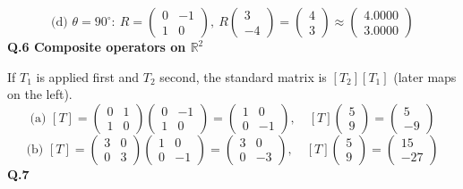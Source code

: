 \[ \text{(d) }\theta=90^\circ:\ R=\begin{pmatrix}0 & -1 \\ 1 & 0\end{pmatrix},\ R\begin{pmatrix}3\\-4\end{pmatrix}=\begin{pmatrix}4 \\ 3\end{pmatrix}\approx\begin{pmatrix}4.0000\\3.0000\end{pmatrix} \]
\medskip\noindent\textbf{Q.6  Composite operators on $\mathbb{R}^2$}\par\smallskip
If $T_1$ is applied first and $T_2$ second, the standard matrix is $[T_2][T_1]$ (later maps on the left).
\[ \text{(a) }[T]=\begin{pmatrix}0 & 1 \\ 1 & 0\end{pmatrix}\begin{pmatrix}0 & -1 \\ 1 & 0\end{pmatrix}=\begin{pmatrix}1 & 0 \\ 0 & -1\end{pmatrix},\quad [T]\begin{pmatrix}5 \\ 9\end{pmatrix}=\begin{pmatrix}5 \\ -9\end{pmatrix} \]
\[ \text{(b) }[T]=\begin{pmatrix}3 & 0 \\ 0 & 3\end{pmatrix}\begin{pmatrix}1 & 0 \\ 0 & -1\end{pmatrix}=\begin{pmatrix}3 & 0 \\ 0 & -3\end{pmatrix},\quad [T]\begin{pmatrix}5 \\ 9\end{pmatrix}=\begin{pmatrix}15 \\ -27\end{pmatrix} \]
\medskip\noindent\textbf{Q.7}\par\smallskip

